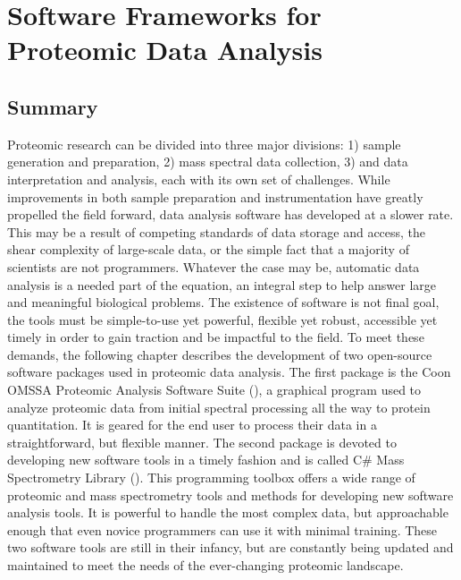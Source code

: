\chapter{Software Frameworks for Proteomic Data Analysis}



\section{Summary}
Proteomic research can be divided into three major divisions: 1) sample generation and preparation, 2) mass spectral data collection, 3) and data interpretation and analysis, each with its own set of challenges. While improvements in both sample preparation and instrumentation have greatly propelled the field forward, data analysis software has developed at a slower rate. This may be a result of competing standards of data storage and access, the shear complexity of large-scale data, or the simple fact that a majority of scientists are not programmers. Whatever the case may be, automatic data analysis is a needed part of the equation, an integral step to help answer large and meaningful biological problems. The existence of software is not final goal, the tools must be simple-to-use yet powerful, flexible yet robust, accessible yet timely in order to gain traction and be impactful to the field. To meet these demands, the following chapter describes the development of two open-source software packages used in proteomic data analysis. The first package is the Coon OMSSA Proteomic Analysis Software Suite (\compass{}), a graphical program used to analyze proteomic data from initial spectral processing all the way to protein quantitation. It is geared for the end user to process their data in a straightforward, but flexible manner. The second package is devoted to developing new software tools in a timely fashion and is called C\# Mass Spectrometry Library (\csmsl{}). This programming toolbox offers a wide range of proteomic and mass spectrometry tools and methods for developing new software analysis tools. It is powerful to handle the most complex data, but approachable enough that even novice programmers can use it with minimal training. These two software tools are still in their infancy, but are constantly being updated and maintained to meet the needs of the ever-changing proteomic landscape.

